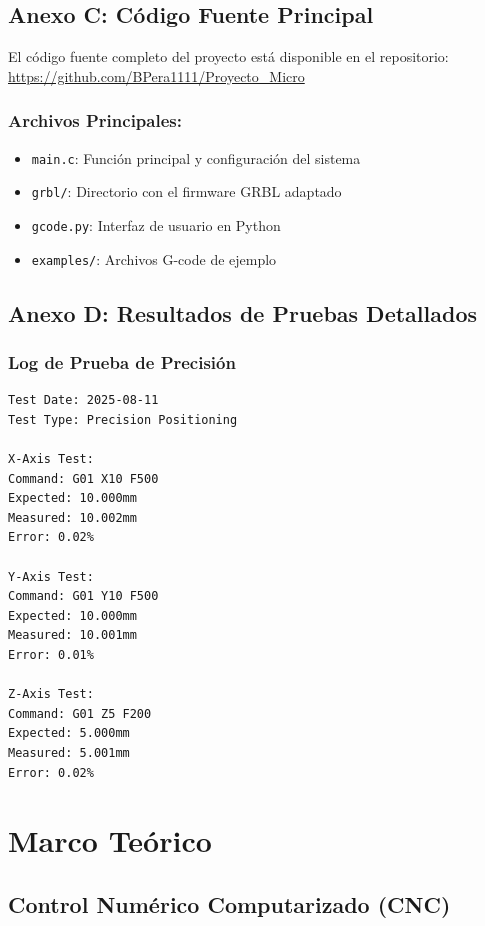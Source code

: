 \documentclass[12pt]{article}
\begin{document}
\subsection{Anexo C: Código Fuente Principal}

El código fuente completo del proyecto está disponible en el repositorio:
\url{https://github.com/BPera1111/Proyecto_Micro}

\subsubsection{Archivos Principales:}
\begin{itemize}
    \item \texttt{main.c}: Función principal y configuración del sistema
    \item \texttt{grbl/}: Directorio con el firmware GRBL adaptado
    \item \texttt{gcode.py}: Interfaz de usuario en Python
    \item \texttt{examples/}: Archivos G-code de ejemplo
\end{itemize}

\subsection{Anexo D: Resultados de Pruebas Detallados}

\subsubsection{Log de Prueba de Precisión}
\begin{lstlisting}[caption={Extracto del log de pruebas}]
Test Date: 2025-08-11
Test Type: Precision Positioning

X-Axis Test:
Command: G01 X10 F500
Expected: 10.000mm
Measured: 10.002mm
Error: 0.02%

Y-Axis Test:
Command: G01 Y10 F500
Expected: 10.000mm
Measured: 10.001mm
Error: 0.01%

Z-Axis Test:
Command: G01 Z5 F200
Expected: 5.000mm
Measured: 5.001mm
Error: 0.02%
\end{lstlisting}


\section{Marco Teórico}

\subsection{Control Numérico Computarizado (CNC)}
\end{document}
